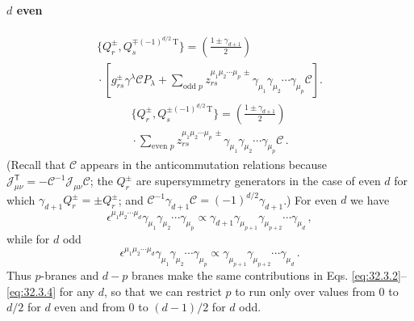 \paragraph{\(d\) even}
\begin{multline}
  \{Q_r^\pm,Q_s^{\mp(-1)^{d/2}\,\mathrm T}\}
  =\left(\frac{1\pm\gamma_{d+1}}{2}\right)\\
  {}\cdot
  \left[
    g_{rs}^\pm\gamma^\lambda\mathcal C P_\lambda
    +\sum_{\text{odd }p}
      z_{rs}^{\mu_1\mu_2\cdots\mu_p\,\pm}
      \gamma_{\mu_1}\gamma_{\mu_2}\cdots\gamma_{\mu_p}\mathcal C
  \right].
  \tag{32.3.3}\label{eq:32.3.3}
\end{multline}
\begin{multline}
  \{Q_r^\pm,Q_s^{\pm(-1)^{d/2}\,\mathrm T}\}
  =\left(\frac{1\pm\gamma_{d+1}}{2}\right)\\
  {}\cdot
    \sum_{\text{even }p}
      z_{rs}^{\mu_1\mu_2\cdots\mu_p\,\pm}
      \gamma_{\mu_1}\gamma_{\mu_2}\cdots\gamma_{\mu_p}\mathcal C\,.
  \tag{32.3.4}\label{eq:32.3.4}
\end{multline}
(Recall that \(\mathcal C\) appears in the anticommutation relations
because
\(\mathscr J_{\mu\nu}^{\mathsf T}
=-\mathcal C^{-1}\mathscr J_{\mu\nu}\mathcal C\); the \(Q_r^\pm\) are
supersymmetry generators in the case of even \(d\) for which
\(\gamma_{d+1}Q_r^\pm=\pm Q_r^\pm\); and
\(\mathcal C^{-1}\gamma_{d+1}\mathcal C
=(-1)^{d/2}\gamma_{d+1}\).) For even \(d\) we have
\[
  \epsilon^{\mu_1\mu_2\cdots\mu_d}
  \gamma_{\mu_1}\gamma_{\mu_2}\cdots\gamma_{\mu_p}
  \mathrel{\propto}
  \gamma_{d+1}\gamma_{\mu_{p+1}}\gamma_{\mu_{p+2}}
  \cdots\gamma_{\mu_d}\,,
\]
while for \(d\) odd
\[
  \epsilon^{\mu_1\mu_2\cdots\mu_d}
  \gamma_{\mu_1}\gamma_{\mu_2}\cdots\gamma_{\mu_p}
  \mathrel{\propto}
  \gamma_{\mu_{p+1}}\gamma_{\mu_{p+2}}\cdots\gamma_{\mu_d}\,.
\]
Thus \(p\)-branes and \(d-p\) branes make the same contributions in
Eqs. \eqref{eq:32.3.2}--\eqref{eq:32.3.4} for any \(d\), so that we can restrict \(p\) to
run only over values from 0 to \(d/2\) for \(d\) even and from 0 to
\((d-1)/2\) for \(d\) odd.

